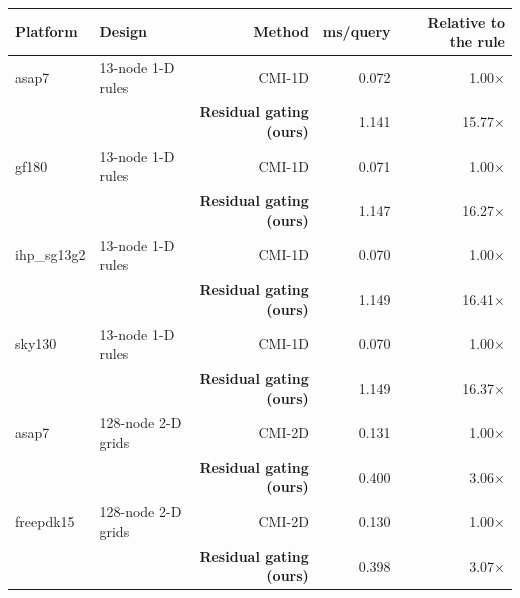 \small
\begin{tabular}{llrrr}\toprule
Platform & Design & Method & ms/query & Relative to the rule \\\midrule
asap7 & 13-node 1-D rules & CMI-1D & 0.072 & 1.00$\times$ \\
 &  & \textbf{Residual gating (ours)} & 1.141 & 15.77$\times$ \\
\midrule
gf180 & 13-node 1-D rules & CMI-1D & 0.071 & 1.00$\times$ \\
 &  & \textbf{Residual gating (ours)} & 1.147 & 16.27$\times$ \\
\midrule
ihp\_sg13g2 & 13-node 1-D rules & CMI-1D & 0.070 & 1.00$\times$ \\
 &  & \textbf{Residual gating (ours)} & 1.149 & 16.41$\times$ \\
\midrule
sky130 & 13-node 1-D rules & CMI-1D & 0.070 & 1.00$\times$ \\
 &  & \textbf{Residual gating (ours)} & 1.149 & 16.37$\times$ \\
\midrule
asap7 & 128-node 2-D grids & CMI-2D & 0.131 & 1.00$\times$ \\
 &  & \textbf{Residual gating (ours)} & 0.400 & 3.06$\times$ \\
\midrule
freepdk15 & 128-node 2-D grids & CMI-2D & 0.130 & 1.00$\times$ \\
 &  & \textbf{Residual gating (ours)} & 0.398 & 3.07$\times$ \\
\bottomrule\end{tabular}
